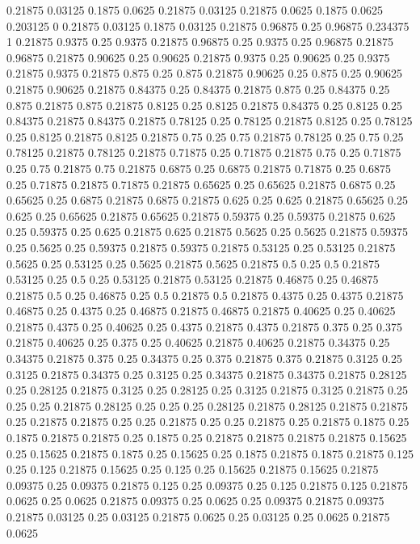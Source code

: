 0.21875 0.03125
0.1875 0.0625
0.21875 0.03125
0.21875 0.0625
0.1875 0.0625
0.203125 0
0.21875 0.03125
0.1875 0.03125
0.21875 0.96875
0.25 0.96875
0.234375 1
0.21875 0.9375
0.25 0.9375
0.21875 0.96875
0.25 0.9375
0.25 0.96875
0.21875 0.96875
0.21875 0.90625
0.25 0.90625
0.21875 0.9375
0.25 0.90625
0.25 0.9375
0.21875 0.9375
0.21875 0.875
0.25 0.875
0.21875 0.90625
0.25 0.875
0.25 0.90625
0.21875 0.90625
0.21875 0.84375
0.25 0.84375
0.21875 0.875
0.25 0.84375
0.25 0.875
0.21875 0.875
0.21875 0.8125
0.25 0.8125
0.21875 0.84375
0.25 0.8125
0.25 0.84375
0.21875 0.84375
0.21875 0.78125
0.25 0.78125
0.21875 0.8125
0.25 0.78125
0.25 0.8125
0.21875 0.8125
0.21875 0.75
0.25 0.75
0.21875 0.78125
0.25 0.75
0.25 0.78125
0.21875 0.78125
0.21875 0.71875
0.25 0.71875
0.21875 0.75
0.25 0.71875
0.25 0.75
0.21875 0.75
0.21875 0.6875
0.25 0.6875
0.21875 0.71875
0.25 0.6875
0.25 0.71875
0.21875 0.71875
0.21875 0.65625
0.25 0.65625
0.21875 0.6875
0.25 0.65625
0.25 0.6875
0.21875 0.6875
0.21875 0.625
0.25 0.625
0.21875 0.65625
0.25 0.625
0.25 0.65625
0.21875 0.65625
0.21875 0.59375
0.25 0.59375
0.21875 0.625
0.25 0.59375
0.25 0.625
0.21875 0.625
0.21875 0.5625
0.25 0.5625
0.21875 0.59375
0.25 0.5625
0.25 0.59375
0.21875 0.59375
0.21875 0.53125
0.25 0.53125
0.21875 0.5625
0.25 0.53125
0.25 0.5625
0.21875 0.5625
0.21875 0.5
0.25 0.5
0.21875 0.53125
0.25 0.5
0.25 0.53125
0.21875 0.53125
0.21875 0.46875
0.25 0.46875
0.21875 0.5
0.25 0.46875
0.25 0.5
0.21875 0.5
0.21875 0.4375
0.25 0.4375
0.21875 0.46875
0.25 0.4375
0.25 0.46875
0.21875 0.46875
0.21875 0.40625
0.25 0.40625
0.21875 0.4375
0.25 0.40625
0.25 0.4375
0.21875 0.4375
0.21875 0.375
0.25 0.375
0.21875 0.40625
0.25 0.375
0.25 0.40625
0.21875 0.40625
0.21875 0.34375
0.25 0.34375
0.21875 0.375
0.25 0.34375
0.25 0.375
0.21875 0.375
0.21875 0.3125
0.25 0.3125
0.21875 0.34375
0.25 0.3125
0.25 0.34375
0.21875 0.34375
0.21875 0.28125
0.25 0.28125
0.21875 0.3125
0.25 0.28125
0.25 0.3125
0.21875 0.3125
0.21875 0.25
0.25 0.25
0.21875 0.28125
0.25 0.25
0.25 0.28125
0.21875 0.28125
0.21875 0.21875
0.25 0.21875
0.21875 0.25
0.25 0.21875
0.25 0.25
0.21875 0.25
0.21875 0.1875
0.25 0.1875
0.21875 0.21875
0.25 0.1875
0.25 0.21875
0.21875 0.21875
0.21875 0.15625
0.25 0.15625
0.21875 0.1875
0.25 0.15625
0.25 0.1875
0.21875 0.1875
0.21875 0.125
0.25 0.125
0.21875 0.15625
0.25 0.125
0.25 0.15625
0.21875 0.15625
0.21875 0.09375
0.25 0.09375
0.21875 0.125
0.25 0.09375
0.25 0.125
0.21875 0.125
0.21875 0.0625
0.25 0.0625
0.21875 0.09375
0.25 0.0625
0.25 0.09375
0.21875 0.09375
0.21875 0.03125
0.25 0.03125
0.21875 0.0625
0.25 0.03125
0.25 0.0625
0.21875 0.0625
